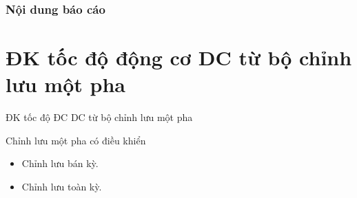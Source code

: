 \documentclass[24pt]{beamer}
\begin{document}
\begin	{frame}	%
	\frametitle{Nội dung báo cáo}
	\tableofcontents
\end{frame}

\section[Bộ chỉnh lưu một pha]{ĐK tốc độ động cơ DC từ bộ chỉnh lưu một pha}
\begin{frame}{ĐK tốc độ ĐC DC từ bộ chỉnh lưu một pha}
	\justifying
	\begin{block}{Chỉnh lưu một pha có điều khiển}
		\begin{itemize}
			\item Chỉnh lưu bán kỳ.
			\item Chỉnh lưu toàn kỳ.
		\end{itemize}
	\end{block}
\end{frame}
\end{document}
